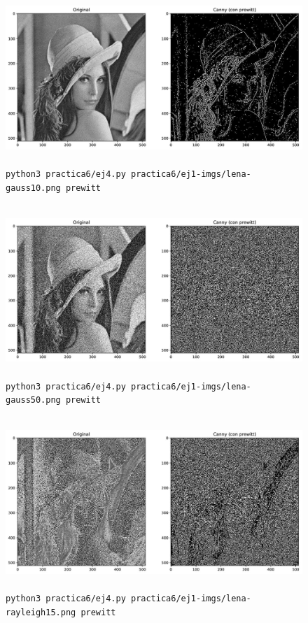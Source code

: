 \documentclass[11pt, spanish]{article}
\begin{document}
\begin{figure}[H]
\centering
    \includegraphics[height=6.5cm]{informe-imgs/ej4-prewitt-lena-gauss10.jpg}
    \caption{\texttt{python3 practica6/ej4.py practica6/ej1-imgs/lena-gauss10.png prewitt}}
\end{figure}

\begin{figure}[H]
\centering
    \includegraphics[height=6.5cm]{informe-imgs/ej4-prewitt-lena-gauss50.jpg}
    \caption{\texttt{python3 practica6/ej4.py practica6/ej1-imgs/lena-gauss50.png prewitt}}
\end{figure}

\begin{figure}[H]
\centering
    \includegraphics[height=6.5cm]{informe-imgs/ej4-prewitt-lena-rayleigh15.jpg}
    \caption{\texttt{python3 practica6/ej4.py practica6/ej1-imgs/lena-rayleigh15.png prewitt}}
\end{figure}
\end{document}
